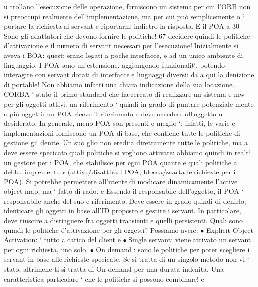 \documentclass[a4paper,12pt]{article}
\begin{document}
u
trollano l'esecuzione delle operazione, forniscono un sistema per cui l'ORB non
si preoccupi realmente dell'implementazione, ma per cui può semplicemente
o
`
portare la richiesta al servant e riportarne indietro la risposta. E il POA a
30 Sono
gli adattatori che devono fornire le politiche!
67
decidere quindi le politiche d'attivazione e il numero di servant necessari per
l'esecuzione!
Inizialmente si aveva i BOA: questi erano legati a poche interfacce, e ad un
unico ambiente di linguaggio. I POA sono un'estensione, aggiungendo funzionalit`, potendo interagire con servant dotati
di interfacce e linguaggi diversi: da
a
qui la denizione di portable! Non abbiamo infatti una chiara indicazione della
sua locazione.
CORBA ` stato il primo standard che ha cercato di realizzare un sistema
e
mw per gli oggetti attivi: un riferimento ` quindi in grado di puntare potenziale
mente a più oggetti: un POA riceve il riferimento e deve accedere all'oggetto
u
desiderato. In generale, meno POA son presenti e meglio `: infatti, le varie
e
implementazioni forniscono un POA di base, che contiene tutte le politiche di
gestione gi` denite. Un suo glio non eredita direttamente tutte le politiche, ma
a
deve essere specicato quali politiche si vogliono attivate: abbiamo quindi in realt` un gestore per i POA, che
stabilisce per ogni POA quante e quali politiche
a
debba implementare (attiva/disattiva i POA, blocca/scarta le richieste per i
POA). Si potrebbe permettere all'utente di modicare dinamicamente l'active
object map, ma ` fatto di rado.
e
Essendo il responsabile dell'oggetto, il POA ` responsabile anche del suo
e
riferimento. Deve essere in grado quindi di denirlo, identicare gli oggetti in
base all'ID proposto e gestire i servant. In particolare, deve riuscire a distinguere
fra oggetti transienti e quelli persistenti.
Quali sono quindi le politiche d'attivazione per gli oggetti? Possiamo avere:
$\bullet$ Explicit Object Activation: ` tutto a carico del client
e
$\bullet$ Single servant: viene attivato un servant per ogni richiesta, uno solo.
$\bullet$ On demand : sono le politiche per poter scegliere i servant in base alle richieste specicate. Se si tratta di
un singolo metodo non vi ` stato, altrimene
ti si tratta di On-demand per una durata indenita. Una caratteristica
particolare ` che le politiche si possono combinare!
e
\end{document}
